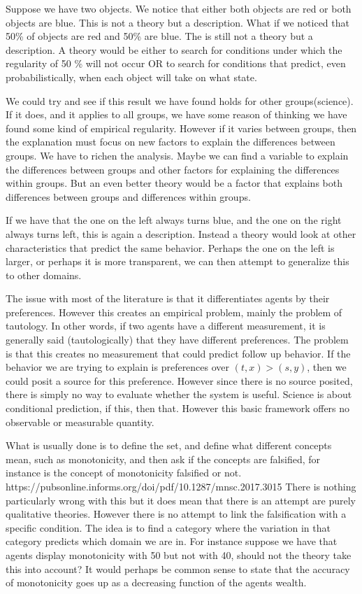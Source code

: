 \documentclass[11pt]{article}
\numberwithin{equation}{section}
\begin{document}


Suppose we have two objects. We notice that either both objects are red or both objects are blue. This is not a theory but a description. What if we noticed that 50\% of objects are red and 50\% are blue. The is still not a theory but a description. A theory would be either to search for conditions under which the regularity of 50 \% will not occur OR to search for conditions that predict, even probabilistically, when each object will take on what state. 

We could try and see if this result we have found holds for other groups(science). If it does, and it applies to all groups, we have some reason of thinking we have found some kind of empirical regularity. However if it varies between groups, then the explanation must focus on new factors to explain the differences between groups. We have to richen the analysis. Maybe we can find a variable to explain the differences between groups and other factors for explaining the differences within groups. But an even better theory would be a factor that explains both differences between groups and differences within groups.  

If we have that the one on the left always turns blue, and the one on the right always turns left, this is again a description. Instead a theory would look at other characteristics that predict the same behavior. Perhaps the one on the left is larger, or perhaps it is more transparent, we can then attempt to generalize this to other domains. 

The issue with most of the literature is that it differentiates agents by their preferences. However this creates an empirical problem, mainly the problem of tautology. In other words, if two agents have a different measurement, it is generally said (tautologically) that they have different preferences. The problem is that this creates no measurement that could predict follow up behavior. If the behavior we are trying to explain is preferences over $(t,x)>(s,y)$, then we could posit a source for this preference. However since there is no source posited, there is simply no way to evaluate whether the system is useful. Science is about conditional prediction, if this, then that. However this basic framework offers no observable or measurable quantity. 

What is usually done is to define the set, and define what different concepts mean, such as monotonicity, and then ask if the concepts are falsified, for instance is the concept of monotonicity falsified or not. https://pubsonline.informs.org/doi/pdf/10.1287/mnsc.2017.3015
There is nothing particularly wrong with this but it does mean that there is an attempt are purely qualitative theories. However there is no attempt to link the falsification with a specific condition. The idea is to find a category where the variation in that category predicts which domain we are in. For instance suppose we have that agents display monotonicity with 50 but not with 40, should not the theory take this into account? It would perhaps be common sense to state that the accuracy of monotonicity goes up as a decreasing function of the agents wealth. 
\end{document}
